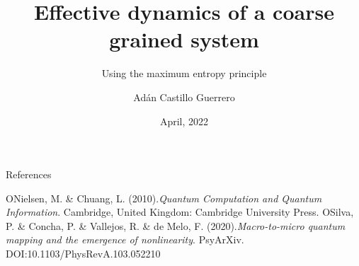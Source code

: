 \documentclass{cubeamer}
\title{Effective dynamics of a coarse grained system}
\subtitle{Using the maximum entropy principle}
\author[Adán Castillo Guerrero]{Adán Castillo Guerrero}
\date{April, 2022} %
\institute[National Autonomous University of Mexico]{National Autonomous University of Mexico}
\begin{document}
\maketitle







\cutoc

\appendix

\begin{frame}{References}
\begin{thebibliography}{99}
\bibitem ONielsen, M. \& Chuang, L. (2010).\textit{Quantum Computation and Quantum Information}. Cambridge, United Kingdom: Cambridge University Press.
\bibitem OSilva, P. \& Concha, P. \& Vallejos, R. \& de Melo, F. (2020).\textit{Macro-to-micro quantum mapping and the emergence of nonlinearity}. PsyArXiv. DOI:10.1103/PhysRevA.103.052210
\end{thebibliography}
\end{frame}
\end{document}
